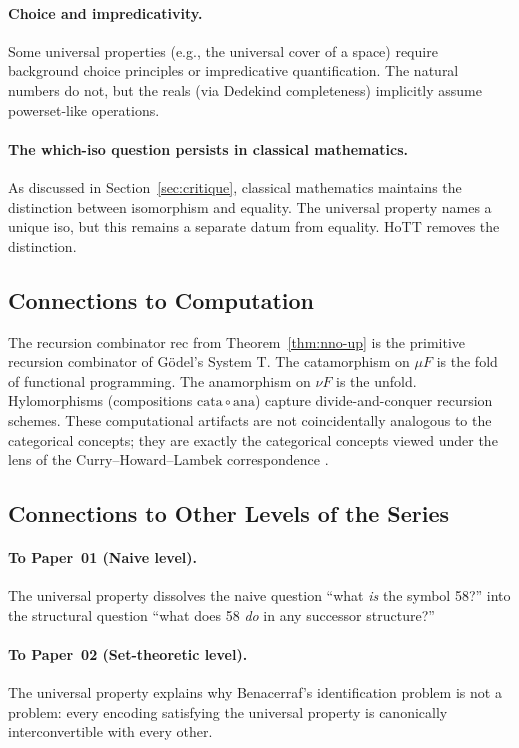 \documentclass[12pt]{article}
\theoremstyle{definition}
\theoremstyle{remark}
\begin{document}
\paragraph{Choice and impredicativity.} Some universal properties (e.g., the universal cover of a space) require background choice principles or impredicative quantification. The natural numbers do not, but the reals (via Dedekind completeness) implicitly assume powerset-like operations.

\paragraph{The which-iso question persists in classical mathematics.} As discussed in Section~\ref{sec:critique}, classical mathematics maintains the distinction between isomorphism and equality. The universal property names a unique iso, but this remains a separate datum from equality. HoTT removes the distinction.

\subsection{Connections to Computation}

The recursion combinator $\mathrm{rec}$ from Theorem~\ref{thm:nno-up} is the primitive recursion combinator of G\"odel's System T. The catamorphism on $\mu F$ is the fold of functional programming. The anamorphism on $\nu F$ is the unfold. Hylomorphisms (compositions $\mathrm{cata} \circ \mathrm{ana}$) capture divide-and-conquer recursion schemes. These computational artifacts are not coincidentally analogous to the categorical concepts; they are exactly the categorical concepts viewed under the lens of the Curry--Howard--Lambek correspondence \cite{Wadler2015,Lambek1972}.

\subsection{Connections to Other Levels of the Series}

\paragraph{To Paper~01 (Naive level).} The universal property dissolves the naive question ``what \emph{is} the symbol 58?'' into the structural question ``what does 58 \emph{do} in any successor structure?''

\paragraph{To Paper~02 (Set-theoretic level).} The universal property explains why Benacerraf's identification problem is not a problem: every encoding satisfying the universal property is canonically interconvertible with every other.
\end{document}
